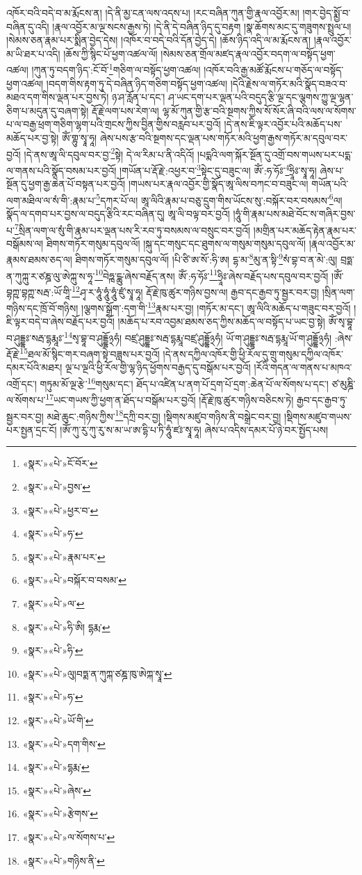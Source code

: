 འཁོར་བའི་བདེ་བ་མ་རྨོངས་ན། །དེ་ནི་མྱ་ངན་ལས་འདས་པ། །རང་བཞིན་ཀུན་གྱི་རྣལ་འབྱོར་མ། །གར་བྱེད་སྨྱོ་བ་བཞིན་དུ་འདི། །རྣལ་འབྱོར་མ་ལྔ་སངས་རྒྱས་ཏེ། །དེ་ནི་དེ་བཞིན་ཉིད་དུ་བརྟག །སྣ་ཆོགས་མང་དུ་གཟུགས་སྤྲུལ་པ། །སེམས་ཅན་རྣམ་པར་སྨིན་བྱེད་དེས། །འཁོར་བ་བདེ་བའི་དོན་བྱེད་དེ། །ཆོས་ཉིད་འདི་ལ་མ་རྨོངས་ན། །རྣལ་འབྱོར་མ་ཡི་ཐར་པ་འདི། །ཆོས་ཀྱི་སྙིང་པོ་ཕྱག་འཚལ་ལོ། །སེམས་ཅན་གྲོལ་མཛད་རྣལ་འབྱོར་བདག་ལ་བསྟོད་ཕྱག་འཚལ། །ཀུན་ཏུ་བདག་ཉིད་:ངོ་བོ་\footnote{«སྣར་»«པེ་»ངོ་བོར་}གཅིག་ལ་བསྟོད་ཕྱག་འཚལ། །འཁོར་བའི་རྒྱ་མཚོ་རྨོངས་པ་གཅོད་ལ་བསྟོད་ཕྱག་འཚལ། །བདག་གིས་རྟག་ཏུ་དེ་བཞིན་ཉིད་གཅིག་བསྟོད་ཕྱག་འཚལ། །དེའི་རྗེས་ལ་གཏོར་མའི་སྣོད་བཟའ་བ་མཐའ་དག་གིས་ལྡན་པར་བྱས་ཏེ། ཉ་ཤ་རློན་པ་དང་། ཤ་ཡང་དག་པར་ལྡན་པའི་བདུད་རྩི་ལྔ་དང་ལྕགས་ཀྱུ་ལྔ་ལྷན་ཅིག་པ་མདུན་དུ་བཞག་སྟེ། རྡོ་རྗེ་ལག་པས་རེག་ལ། ལྷ་མོ་ཀུན་གྱི་རྩ་བའི་སྔགས་ཀྱིས་སོ་སོར་ཞི་བའི་ལས་ལ་སོགས་པ་ལ་བརྒྱ་ཕྲག་གཅིག་ལྷག་པའི་གྲངས་ཀྱིས་བྱིན་གྱིས་བརླབ་པར་བྱའོ། །དེ་ནས་ཇི་ལྟར་འབྱོར་པའི་མཆོད་པས་མཆོད་པར་བྱ་སྟེ། ཨོཾ་གྷུ་སྭཱ་ཧཱ། ཞེས་པས་རྩ་བའི་སྔགས་དང་ལྡན་པས་གཏོར་མའི་ཕྱག་རྒྱས་གཏོར་མ་དབུལ་བར་བྱའོ། །དེ་ནས་ཨཱ་ལི་དབུལ་བར་བྱ་\footnote{«སྣར་»«པེ་»བྱས་}སྟེ། དེ་ལ་རིམ་པ་ནི་འདིའོ། །པདྨའི་ལག་སྐོར་སྔོན་དུ་འགྲོ་བས་གཡས་པར་པདྨ་ལ་གནས་པའི་སྣོད་བསམ་པར་བྱའོ། །གཡོན་པ་རྡོ་རྗེ་:འཕྱར་བ་\footnote{«སྣར་»«པེ་»ཕྱར་བ་}སྟེང་དུ་བཟུང་ལ། ཨོཾ་:ཧ་ཧོཿ་\footnote{«སྣར་»«པེ་»ཧ་}ཧྲཱིཿ་སྭཱ་ཧཱ། ཞེས་པ་སྔོན་དུ་ཕྱག་རྒྱ་ཆེན་པོ་བསྟན་པར་བྱའོ། །གཡས་པར་རྣལ་འབྱོར་གྱི་སྣོད་ཨཱ་ལིས་བཀང་བ་བཟུང་ལ། གཡོན་པའི་ལག་མཐིལ་ལ་སཾ་གི་:རྣམ་པ་\footnote{«སྣར་»«པེ་»རྣམ་པར་}དཀར་པོ་ལ། ཨཱ་ལིའི་རྣམ་པ་བཅུ་དྲུག་གིས་ཡོངས་སུ་:བསྐོར་བར་བསམས་\footnote{«སྣར་»«པེ་»བསྐོར་བ་བསམ་}ལ། སྣོད་ལ་དགབ་པར་བྱས་ལ་བདུད་རྩིའི་རང་བཞིན་དུ། ཨཱ་ལི་བལྟ་བར་བྱའོ། །ཧཱུཾ་གི་རྣམ་པས་མཐེ་བོང་ས་གཞིར་བྱས་པ་\footnote{«སྣར་»«པེ་»ལ་}སྲིན་ལག་ལ་སུཾ་གི་རྣམ་པར་ལྡན་པས་རི་རབ་ཏུ་བསམས་ལ་བསྲུང་བར་བྱའོ། །མགྲིན་པར་མཆོད་རྟེན་རྣམ་པར་བསྒོམས་ལ། ཐིགས་གཏོར་གསུམ་དབུལ་ལོ། །སྐུ་དང་གསུང་དང་ཐུགས་ལ་གསུམ་གསུམ་དབུལ་ལོ། །རྣལ་འབྱོར་མ་རྣམས་ཐམས་ཅད་ལ། ཐིགས་གཏོར་གསུམ་དབུལ་ལོ། །པི་ཙི་ཨ་སོ་:ཧི་ཨ། དྷ་མ་\footnote{«སྣར་»«པེ་»ཧི་ཨི། དྷརྨ་}མུ་ན་སྟི་\footnote{«སྣར་»«པེ་»ཧི་}སཾ་བྷ་བ་ན་མེ་:ལུ། བྲཧྨ་ན་ཀུཀྐུ་ར་ཙཎྜ་ལུ་ཨེཀྐུ་ས་ཧཱ་\footnote{«སྣར་»«པེ་»ལུ།བཏྨ་ན་ཀུཀྐ་ཙཎྜ་ཁུ་ཨེཀྐ་སྭཱ་}བེཧྑ་དྪུ་ཞེས་བརྗོད་ནས། ཨོཾ་:ཧ་ཧོཿ་\footnote{«སྣར་»«པེ་»ཧ་}ཧྲཱིཿ་ཞེས་བརྗོད་པས་དབུལ་བར་བྱའོ། །ཨོཾ་བྷཀྵ་བྷཀྵ་སརྦ་:ཡོ་གཱི་\footnote{«སྣར་»«པེ་»ཡོ་གི་}ཤྭ་ར་ཧཱུཾ་ཧཱུཾ་ཧཱུཾ་ཛུཾ་སྭཱ་ཧཱ། རྡོ་རྗེ་ཁུ་ཚུར་གཉིས་བྱས་ལ། རྒྱབ་དང་རྒྱབ་ཏུ་སྦྱར་བར་བྱ། །སྲིན་ལག་གཉིས་དང་ཁྲོ་བོ་གཉིས། །ལྕགས་སྒྲོག་:དག་གི་\footnote{«སྣར་»«པེ་»དག་གིས་}རྣམ་པར་བྱ། །གཏོར་མ་དང་། ཨཱ་ལིའི་མཆོད་པ་གཟུང་བར་བྱའོ། །ཇི་ལྟར་བདེ་བ་ཞེས་བརྗོད་པར་བྱའོ། །མཆོད་པ་རབ་འབྱམ་ཐམས་ཅད་ཀྱིས་མཆོད་ལ་བསྟོད་པ་ཡང་བྱ་སྟེ། ཨོཾ་སྭ་བྷཱ་བ་ཤུདྡྷཿ་སརྦ་དྷརྨཱཿ་\footnote{«སྣར་»«པེ་»དྷརྨ་}སྭ་བྷཱ་བ་ཤུདྡྷོ྅ཧཾ། བཛྲ་ཤུདྡྷཿ་སརྦ་དྷརྨཱ་བཛྲ་ཤུདྡྷོ྅ཧཾ། ཡོ་ག་ཤུདྡྷཿ་སརྦ་དྷརྨཱ་ཡོ་ག་ཤུདྡྷོ྅ཧཾ། :ཞེས་རྡོ་རྗེ་\footnote{«སྣར་»«པེ་»ཞེས་}ཐལ་མོ་སྙིང་གར་བཞག་སྟེ་བཟླས་པར་བྱའོ། །དེ་ནས་དཀྱིལ་འཁོར་གྱི་ཕྱི་རོལ་དུ་གྲུ་གསུམ་དཀྱིལ་འཁོར་དམར་པོའི་མཐར། ལྔ་པ་ལྔའི་ཕྱི་རོལ་གྱི་ལྷ་ཉིད་ཕྱོགས་བརྒྱད་དུ་བསྒོམ་པར་བྱའོ། །རོའི་གདན་ལ་གནས་པ་མཁའ་འགྲོ་དང་། གཏུམ་མོ་ལྔ་རྩེ་\footnote{«སྣར་»«པེ་»རྩེགས་}གསུམ་དང་། ཐོད་པ་འཛིན་པ་ནག་པོ་དྲག་པོ་དྲག་:ཆེན་པོ་ལ་སོགས་པ་དང་། ཙ་མུཎྜི་ལ་སོགས་པ་\footnote{«སྣར་»«པེ་»ལ་སོགས་པ་}ཡང་གཡས་ཀྱི་ཕྱག་ན་ཐོད་པ་བསྒོམ་པར་བྱའོ། །རྡོ་རྗེ་ཁུ་ཚུར་གཉིས་བཅིངས་ཏེ། རྒྱབ་དང་རྒྱབ་ཏུ་སྦྱར་བར་བྱ། མཐེ་ཆུང་:གཉིས་ཀྱིས་\footnote{«སྣར་»«པེ་»གཉིས་ནི་}དཀྲི་བར་བྱ། །སྡིགས་མཛུབ་གཉིས་ནི་བསྒྲེང་བར་བྱ། །སྡིགས་མཛུབ་གཡས་པར་སྤྱན་དྲང་ངོ། །ཨོཾ་ཀུ་རུ་ཀུ་རུ་ས་མ་ཡ་ཨ་དྷི་པ་ཏི་ཧཱུཾ་ཛཿ་སྭཱ་ཧཱ། ཞེས་པ་འདིས་དམར་པོ་ཉེ་བར་སྤྱོད་པས། 